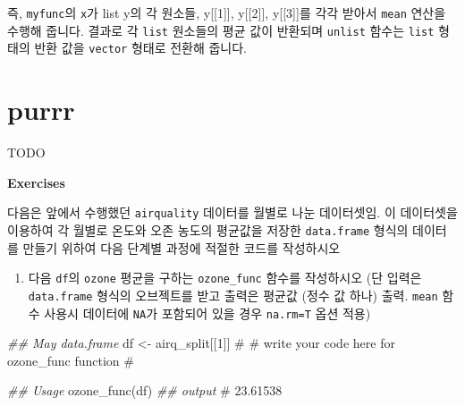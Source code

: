 \documentclass[
  a4paper,
]{book}
\newenvironment{Shaded}{\begin{snugshade}}{\end{snugshade}}
\newcommand{\CommentTok}[1]{\textcolor[rgb]{0.37,0.37,0.37}{#1}}
\newcommand{\DecValTok}[1]{\textcolor[rgb]{0.68,0.00,0.00}{#1}}
\newcommand{\DocumentationTok}[1]{\textcolor[rgb]{0.37,0.37,0.37}{\textit{#1}}}
\newcommand{\FunctionTok}[1]{\textcolor[rgb]{0.28,0.35,0.67}{#1}}
\newcommand{\NormalTok}[1]{\textcolor[rgb]{0.00,0.23,0.31}{#1}}
\newcommand{\OtherTok}[1]{\textcolor[rgb]{0.00,0.23,0.31}{#1}}
\newcommand{\SpecialCharTok}[1]{\textcolor[rgb]{0.37,0.37,0.37}{#1}}
\providecommand{\tightlist}{%
  \setlength{\itemsep}{0pt}\setlength{\parskip}{0pt}}\usepackage{longtable,booktabs,array}
\begin{document}
즉, \texttt{myfunc}의 \texttt{x}가 list y의 각 원소들, y{[}{[}1{]}{]},
y{[}{[}2{]}{]}, y{[}{[}3{]}{]}를 각각 받아서 \texttt{mean} 연산을 수행해
줍니다. 결과로 각 \texttt{list} 원소들의 평균 값이 반환되며
\texttt{unlist} 함수는 \texttt{list} 형태의 반환 값을 \texttt{vector}
형태로 전환해 줍니다.

\hypertarget{purrr}{%
\section{purrr}\label{purrr}}

TODO

\textbf{Exercises}

다음은 앞에서 수행했던 \texttt{airquality} 데이터를 월별로 나눈
데이터셋임. 이 데이터셋을 이용하여 각 월별로 온도와 오존 농도의 평균값을
저장한 \texttt{data.frame} 형식의 데이터를 만들기 위하여 다음 단계별
과정에 적절한 코드를 작성하시오

\begin{Shaded}
\end{Shaded}

\begin{enumerate}
\def\labelenumi{\arabic{enumi})}
\tightlist
\item
  다음 \texttt{df}의 \texttt{ozone} 평균을 구하는 \texttt{ozone\_func}
  함수를 작성하시오 (단 입력은 \texttt{data.frame} 형식의 오브젝트를
  받고 출력은 평균값 (정수 값 하나) 출력. \texttt{mean} 함수 사용시
  데이터에 \texttt{NA}가 포함되어 있을 경우 \texttt{na.rm=T} 옵션 적용)
\end{enumerate}

\begin{Shaded}
\begin{Highlighting}[]
\DocumentationTok{\#\# May data.frame}
\NormalTok{df }\OtherTok{\textless{}{-}}\NormalTok{ airq\_split[[}\DecValTok{1}\NormalTok{]]}
\CommentTok{\#}
\CommentTok{\# write your code here for ozone\_func function}
\CommentTok{\#}

\DocumentationTok{\#\# Usage}
\FunctionTok{ozone\_func}\NormalTok{(df)}
\DocumentationTok{\#\# output}
\CommentTok{\# 23.61538}
\end{Highlighting}
\end{Shaded}
\end{document}
